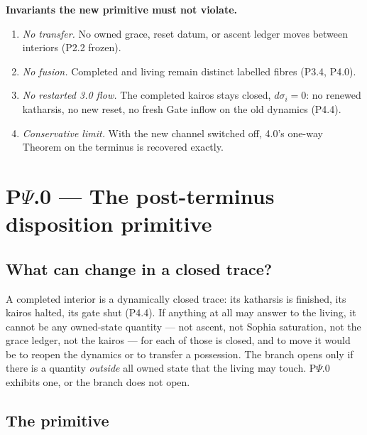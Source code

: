 \documentclass[11pt,a4paper]{article}
\theoremstyle{definition}
\theoremstyle{plain}
\theoremstyle{remark}
\begin{document}
\noindent\textbf{Invariants the new primitive must not violate.}
\begin{enumerate}[label=\textup{(N\arabic*)},leftmargin=1.2cm]
\item \emph{No transfer.} No owned grace, reset datum, or ascent ledger moves between interiors
(P2.2 frozen).
\item \emph{No fusion.} Completed and living remain distinct labelled fibres (P3.4, P4.0).
\item \emph{No restarted 3.0 flow.} The completed kairos stays closed, \(d\sigma_i=0\): no
renewed katharsis, no new reset, no fresh Gate inflow on the old dynamics (P4.4).
\item \emph{Conservative limit.} With the new channel switched off, 4.0's one-way
\(\mathrm{Theorem}\) on the terminus is recovered exactly.
\end{enumerate}

\section{P$\Psi$.0 --- The post-terminus disposition primitive}

\subsection{What can change in a closed trace?}

A completed interior is a dynamically closed trace: its katharsis is finished, its kairos
halted, its gate shut (P4.4). If anything at all may answer to the living, it cannot be any
owned-state quantity --- not ascent, not Sophia saturation, not the grace ledger, not the
kairos --- for each of those is closed, and to move it would be to reopen the dynamics or to
transfer a possession. The branch opens only if there is a quantity \emph{outside} all owned
state that the living may touch. P$\Psi$.0 exhibits one, or the branch does not open.

\subsection{The primitive}
\end{document}
